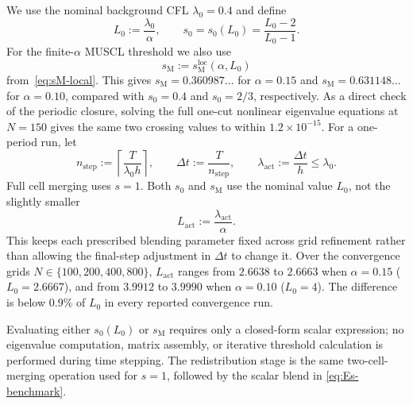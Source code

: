 \documentclass[preprint,12pt]{elsarticle}
\begin{document}
We use the nominal background CFL $\lambda_0=0.4$ and define
\[
    L_0:=\frac{\lambda_0}{\alpha},
    \qquad
    s_0=s_0(L_0)=\frac{L_0-2}{L_0-1}.
\]
For the finite-$\alpha$ MUSCL threshold we also use
\[
    s_{\mathrm M}
    :=
    s_{\mathrm M}^{\mathrm{loc}}(\alpha,L_0)
\]
from~\eqref{eq:sM-local}.  This gives
$s_{\mathrm M}=0.360987\ldots$ for $\alpha=0.15$ and
$s_{\mathrm M}=0.631148\ldots$ for $\alpha=0.10$, compared with
$s_0=0.4$ and $s_0=2/3$, respectively.  As a direct check of the periodic
closure, solving the full one-cut nonlinear eigenvalue equations at $N=150$
gives the same two crossing values to within $1.2\times10^{-15}$.
For a one-period run, let
\[
    n_{\mathrm{step}}:=\left\lceil\frac{T}{\lambda_0 h}\right\rceil,
    \qquad
    \Delta t:=\frac{T}{n_{\mathrm{step}}},
    \qquad
    \lambda_{\mathrm{act}}:=\frac{\Delta t}{h}\le\lambda_0.
\]
Full cell merging uses $s=1$.  Both $s_0$ and $s_{\mathrm M}$ use the nominal value
$L_0$, not the slightly smaller
\[
    L_{\mathrm{act}}:=\frac{\lambda_{\mathrm{act}}}{\alpha}.
\]
This keeps each prescribed blending parameter fixed across grid
refinement rather than allowing the final-step adjustment in $\Delta t$ to
change it.  Over the convergence grids $N\in\{100,200,400,800\}$,
$L_{\mathrm{act}}$ ranges from $2.6638$ to $2.6663$ when
$\alpha=0.15$ ($L_0=2.6667$), and from $3.9912$ to $3.9990$ when
$\alpha=0.10$ ($L_0=4$).  The difference is below $0.9\%$ of $L_0$ in
every reported convergence run.

Evaluating either $s_0(L_0)$ or $s_{\mathrm M}$ requires only a closed-form
scalar expression; no eigenvalue computation, matrix assembly, or iterative
threshold calculation is performed during time stepping.  The redistribution stage is
the same two-cell-merging operation used for $s=1$, followed by the scalar blend in
\eqref{eq:Es-benchmark}.
\end{document}
